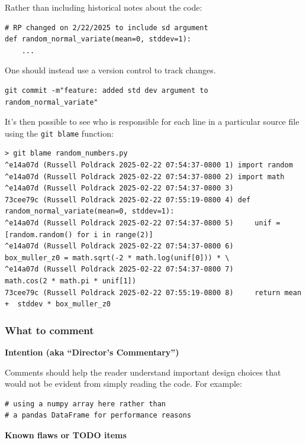 Rather than including historical notes about the code:

\begin{lstlisting}[style=Pythonshort]
# RP changed on 2/22/2025 to include sd argument
def random_normal_variate(mean=0, stddev=1):
    ...
\end{lstlisting}

One should instead use a version control to track changes.

\begin{lstlisting}[style=Pythonshort]
git commit -m"feature: added std dev argument to random_normal_variate"
\end{lstlisting}

It's then possible to see who is responsible for each line in a particular source file using the \texttt{git blame} function:

\begin{lstlisting}[style=shell]
> git blame random_numbers.py
^e14a07d (Russell Poldrack 2025-02-22 07:54:37-0800 1) import random
^e14a07d (Russell Poldrack 2025-02-22 07:54:37-0800 2) import math
^e14a07d (Russell Poldrack 2025-02-22 07:54:37-0800 3)
73cee79c (Russell Poldrack 2025-02-22 07:55:19-0800 4) def random_normal_variate(mean=0, stddev=1):
^e14a07d (Russell Poldrack 2025-02-22 07:54:37-0800 5)     unif = [random.random() for i in range(2)]
^e14a07d (Russell Poldrack 2025-02-22 07:54:37-0800 6)     box_muller_z0 = math.sqrt(-2 * math.log(unif[0])) * \
^e14a07d (Russell Poldrack 2025-02-22 07:54:37-0800 7)         math.cos(2 * math.pi * unif[1])
73cee79c (Russell Poldrack 2025-02-22 07:55:19-0800 8)     return mean +  stddev * box_muller_z0
\end{lstlisting}

\subsubsection{What to comment}

\textbf{Intention (aka ``Director's Commentary'')}

Comments should help the reader understand important design choices that would not be evident from simply reading the code.
For example:

\begin{lstlisting}[style=Pythonshort]
# using a numpy array here rather than
# a pandas DataFrame for performance reasons
\end{lstlisting}

\textbf{Known flaws or TODO items}

